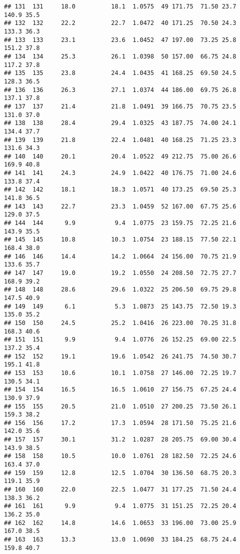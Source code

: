 \documentclass[
]{book}
\theoremstyle{definition}
\theoremstyle{definition}
\theoremstyle{definition}
\theoremstyle{definition}
\theoremstyle{remark}
\begin{document}
\begin{verbatim}
## 131  131     18.0          18.1  1.0575  49 171.75  71.50 23.7    140.9 35.5
## 132  132     22.2          22.7  1.0472  40 171.25  70.50 24.3    133.3 36.3
## 133  133     23.1          23.6  1.0452  47 197.00  73.25 25.8    151.2 37.8
## 134  134     25.3          26.1  1.0398  50 157.00  66.75 24.8    117.2 37.8
## 135  135     23.8          24.4  1.0435  41 168.25  69.50 24.5    128.3 36.5
## 136  136     26.3          27.1  1.0374  44 186.00  69.75 26.8    137.1 37.8
## 137  137     21.4          21.8  1.0491  39 166.75  70.75 23.5    131.0 37.0
## 138  138     28.4          29.4  1.0325  43 187.75  74.00 24.1    134.4 37.7
## 139  139     21.8          22.4  1.0481  40 168.25  71.25 23.3    131.6 34.3
## 140  140     20.1          20.4  1.0522  49 212.75  75.00 26.6    169.9 40.8
## 141  141     24.3          24.9  1.0422  40 176.75  71.00 24.6    133.8 37.4
## 142  142     18.1          18.3  1.0571  40 173.25  69.50 25.3    141.8 36.5
## 143  143     22.7          23.3  1.0459  52 167.00  67.75 25.6    129.0 37.5
## 144  144      9.9           9.4  1.0775  23 159.75  72.25 21.6    143.9 35.5
## 145  145     10.8          10.3  1.0754  23 188.15  77.50 22.1    168.4 38.0
## 146  146     14.4          14.2  1.0664  24 156.00  70.75 21.9    133.6 35.7
## 147  147     19.0          19.2  1.0550  24 208.50  72.75 27.7    168.9 39.2
## 148  148     28.6          29.6  1.0322  25 206.50  69.75 29.8    147.5 40.9
## 149  149      6.1           5.3  1.0873  25 143.75  72.50 19.3    135.0 35.2
## 150  150     24.5          25.2  1.0416  26 223.00  70.25 31.8    168.3 40.6
## 151  151      9.9           9.4  1.0776  26 152.25  69.00 22.5    137.2 35.4
## 152  152     19.1          19.6  1.0542  26 241.75  74.50 30.7    195.1 41.8
## 153  153     10.6          10.1  1.0758  27 146.00  72.25 19.7    130.5 34.1
## 154  154     16.5          16.5  1.0610  27 156.75  67.25 24.4    130.9 37.9
## 155  155     20.5          21.0  1.0510  27 200.25  73.50 26.1    159.3 38.2
## 156  156     17.2          17.3  1.0594  28 171.50  75.25 21.6    142.0 35.6
## 157  157     30.1          31.2  1.0287  28 205.75  69.00 30.4    143.9 38.5
## 158  158     10.5          10.0  1.0761  28 182.50  72.25 24.6    163.4 37.0
## 159  159     12.8          12.5  1.0704  30 136.50  68.75 20.3    119.1 35.9
## 160  160     22.0          22.5  1.0477  31 177.25  71.50 24.4    138.3 36.2
## 161  161      9.9           9.4  1.0775  31 151.25  72.25 20.4    136.2 35.0
## 162  162     14.8          14.6  1.0653  33 196.00  73.00 25.9    167.0 38.5
## 163  163     13.3          13.0  1.0690  33 184.25  68.75 24.4    159.8 40.7

\end{verbatim}
\end{document}
